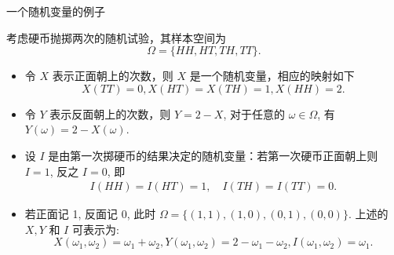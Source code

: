 \begin{frame}{一个随机变量的例子}
	\begin{exam}\label{312}
		考虑硬币抛掷两次的随机试验，其样本空间为 $$\Omega=\{HH,HT,TH,TT\}.$$ %
		\begin{itemize}[<+-|alert@+>]
			\item 令 $X$ 表示正面朝上的次数，则 $X$ 是一个随机变量，相应的映射如下
			      $$X(TT)=0, X(HT)=X(TH)=1, X(HH)=2.$$
			\item 令 $Y$ 表示反面朝上的次数，则 $Y=2-X$, 对于任意的 $\omega\in \Omega$, 有 $Y (\omega)=2-X (\omega)$.
			\item 设 $I$ 是由第一次掷硬币的结果决定的随机变量：若第一次硬币正面朝上则 $I=1$, 反之 $I=0$, 即
			      \begin{align*}
				      I(HH)=I(HT)=1,\quad I(TH)=I(TT)=0.
			      \end{align*}
			\item 若正面记 1, 反面记 0, 此时 $\Omega=\{(1,1),(1,0),(0,1),(0,0)\}$. 上述的 $X,Y$ 和 $I$ 可表示为:$$X (\omega_1,\omega_2)=\omega_1+\omega_2,Y (\omega_1,\omega_2)=2-\omega_1-\omega_2,I (\omega_1,\omega_2)=\omega_1.$$
		\end{itemize}
	\end{exam}
\end{frame}


